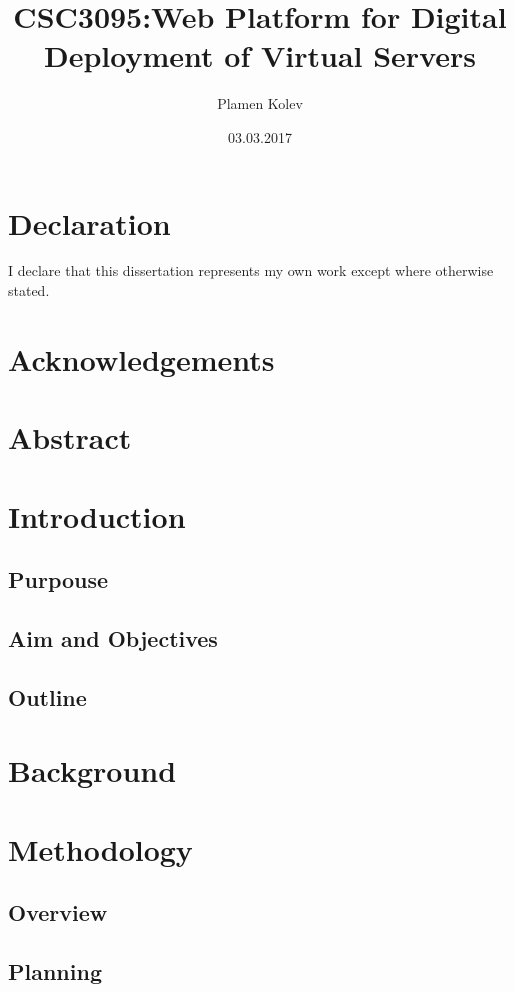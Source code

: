 \documentclass{article}
\title{CSC3095:Web Platform for Digital Deployment of Virtual Servers}
\date{03.03.2017}
\author{Plamen Kolev}
\begin{document}
  \maketitle
  \newpage
  \tableofcontents
  \newpage
  \listoffigures
  \newpage

  \newpage
  \section{Declaration}
    I declare that this dissertation represents my own work except where otherwise stated.

  \newpage
  \section{Acknowledgements}


  \newpage
  \section{Abstract}


  \newpage
  \section{Introduction}
  \subsection{Purpouse}
  \subsection{Aim and Objectives}
  \subsection{Outline}

  \newpage
  \section{Background}

  \newpage
  \section{Methodology}
  \subsection{Overview}
  \subsection{Planning}
\end{document}
